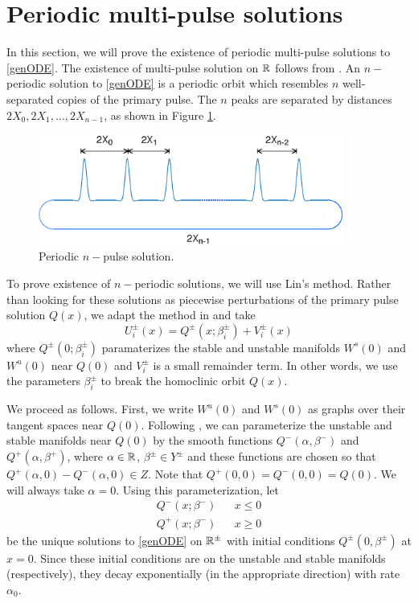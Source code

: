 \documentclass[thesis.tex]{subfiles}
\begin{document}
\section{Periodic multi-pulse solutions}

In this section, we will prove the existence of periodic multi-pulse solutions to \eqref{genODE}. The existence of multi-pulse solution on ${\mathbb R}$ follows from \cite{SandstedeStrut}. An $n-$periodic solution to \eqref{genODE} is a periodic orbit which resembles $n$ well-separated copies of the primary pulse. The $n$ peaks are separated by distances $2X_0, 2X_1, \dots, 2X_{n-1}$, as shown in Figure \ref{fig:permultipulse}.

\begin{figure}[H]
\label{fig:permultipulse}
\includegraphics[width=10cm]{periodic/multipulseperiodic}
\caption{Periodic $n-$pulse solution.}
\end{figure} 

To prove existence of $n-$periodic solutions, we will use Lin's method. Rather than looking for these solutions as piecewise perturbations of the primary pulse solution $Q(x)$, we adapt the method in \cite{Sandstede1997} and take 
\[
U_i^\pm(x) = Q^\pm(x; \beta_i^\pm) + V_i^\pm(x)
\]
where $Q^\pm(0; \beta_i^\pm)$ paramaterizes the stable and unstable manifolds $W^s(0)$ and $W^u(0)$ near $Q(0)$ and $V_i^\pm$ is a small remainder term. In other words, we use the parameters $\beta_i^\pm$ to break the homoclinic orbit $Q(x)$.

We proceed as follows. First, we write $W^u(0)$ and $W^s(0)$ as graphs over their tangent spaces near $Q(0)$. Following \cite{Sandstede1997}, we can parameterize the unstable and stable manifolds near $Q(0)$ by the smooth functions $Q^-(\alpha, \beta^-)$ and $Q^+(\alpha, \beta^+)$, where $\alpha \in {\mathbb R}$, $\beta^\pm \in Y^\pm$ and these functions are chosen so that $Q^+(\alpha, 0) - Q^-(\alpha, 0) \in Z$. Note that $Q^+(0, 0) = Q^-(0, 0) = Q(0)$. We will always take $\alpha = 0$. Using this parameterization, let
\begin{align*}
Q^-(x; \beta^-) && x \leq 0 \\
Q^+(x; \beta^-) && x \geq 0
\end{align*}
be the unique solutions to \eqref{genODE} on ${\mathbb R}^\pm$ with initial conditions $Q^\pm(0, \beta^\pm)$ at $x = 0$. Since these initial conditions are on the unstable and stable manifolds (respectively), they decay exponentially (in the appropriate direction) with rate $\alpha_0$.
\end{document}
